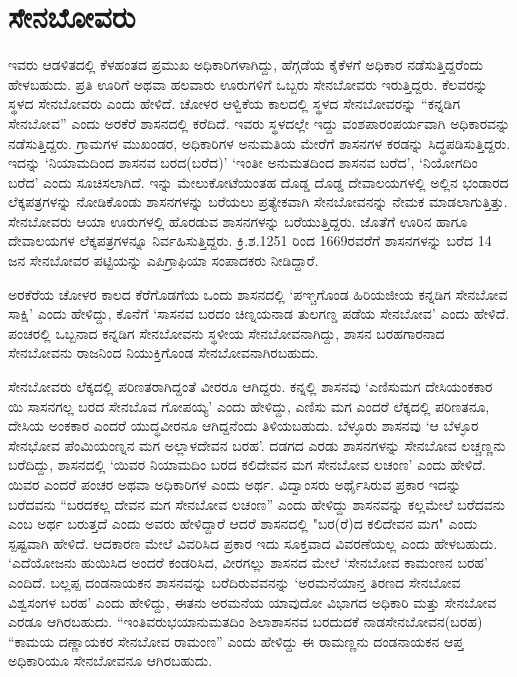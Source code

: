 \section*{ಸೇನಬೋವರು}

ಇವರು ಆಡಳಿತದಲ್ಲಿ ಕೆಳಹಂತದ ಪ್ರಮುಖ ಅಧಿಕಾರಿಗಳಾಗಿದ್ದು, ಹೆಗ್ಗಡೆಯ ಕೈಕೆಳಗೆ ಅಧಿಕಾರ ನಡೆಸುತ್ತಿದ್ದರೆಂದು ಹೇಳಬಹುದು. ಪ್ರತಿ ಊರಿಗೆ ಅಥವಾ ಹಲವಾರು ಊರುಗಳಿಗೆ ಒಬ್ಬರು ಸೇನಬೋವರು ಇರುತ್ತಿದ್ದರು. ಕೆಲವರನ್ನು ಸ್ಥಳದ ಸೇನಬೋವರು ಎಂದು ಹೇಳಿದೆ. ಚೋಳರ ಆಳ್ವಿಕೆಯ ಕಾಲದಲ್ಲಿ ಸ್ಥಳದ ಸೇನಬೋವರನ್ನು “ಕನ್ನಡಿಗ ಸೇನಬೋವ” ಎಂದು ಅರಕೆರೆ ಶಾಸನದಲ್ಲಿ ಕರೆದಿದೆ. ಇವರು ಸ್ಥಳದಲ್ಲೇ ಇದ್ದು ವಂಶಪಾರಂಪರ್ಯವಾಗಿ ಅಧಿಕಾರವನ್ನು ನಡೆಸುತ್ತಿದ್ದರು. ಗ್ರಾಮಗಳ ಮುಖಂಡರ, ಅಧಿಕಾರಿಗಳ ಅನುಮತಿಯ ಮೇರೆಗೆ ಶಾಸನಗಳ ಕರಡನ್ನು ಸಿದ್ಧಪಡಿಸುತ್ತಿದ್ದರು. ಇದನ್ನು ‘ನಿಯಾಮದಿಂದ ಶಾಸನವ ಬರದ(ಬರೆದ)’ ‘ಇಂತೀ ಅನುಮತದಿಂದ ಶಾಸನವ ಬರೆದ’, ‘ನಿಯೋಗದಿಂ ಬರೆದ’ ಎಂದು ಸೂಚಿಸಲಾಗಿದೆ. ಇನ್ನು ಮೇಲುಕೋಟೆಯಂತಹ ದೊಡ್ಡ ದೊಡ್ಡ ದೇವಾಲಯಗಳಲ್ಲಿ ಅಲ್ಲಿನ ಭಂಡಾರದ ಲೆಕ್ಕಪತ್ರಗಳನ್ನು ನೋಡಿಕೊಂಡು ಶಾಸನಗಳನ್ನು ಬರೆಯಲು ಪ್ರತ್ಯೇಕವಾಗಿ ಸೇನಬೋವನನ್ನು ನೇಮಕ ಮಾಡಲಾಗುತ್ತಿತ್ತು. ಸೇನಬೋವರು ಆಯಾ ಊರುಗಳಲ್ಲಿ ಹೊರಡುವ ಶಾಸನಗಳನ್ನು ಬರೆಯು\-ತ್ತಿದ್ದರು. ಜೊತೆಗೆ ಊರಿನ ಹಾಗೂ ದೇವಾಲಯಗಳ ಲೆಕ್ಕಪತ್ರಗಳನ್ನೂ ನಿರ್ವಹಿಸುತ್ತಿದ್ದರು. ಕ್ರಿ.ಶ.1251 ರಿಂದ 1669ರವರೆಗೆ ಶಾಸನಗಳನ್ನು ಬರೆದ 14 ಜನ ಸೇನಬೋವರ ಪಟ್ಟಿಯನ್ನು ಎಪಿಗ್ರಾಫಿಯಾ ಸಂಪಾದಕರು ನೀಡಿದ್ದಾರೆ.

ಅರಕೆರೆಯ ಚೋಳರ ಕಾಲದ ಕೆರೆಗೊಡಗೆಯ ಒಂದು ಶಾಸನದಲ್ಲಿ ‘ಪಞ್ಚಗೊಂಡ ಹಿರಿಯಜೀಯ ಕನ್ನಡಿಗ ಸೇನಬೋವ ಸಾಕ್ಷಿ’ ಎಂದು ಹೇಳಿದ್ದು, ಕೊನೆಗೆ ‘ಸಾಸನವ ಬರದಂ ಚಿಣ್ನಯನಾಡ ತುಲಗಣ್ಡ ಪಡೆಯ ಸೇನಬೋವ’ ಎಂದು ಹೇಳಿದೆ. ಪಂಚರಲ್ಲಿ ಒಬ್ಬನಾದ ಕನ್ನಡಿಗ ಸೇನಬೋವನು ಸ್ಥಳೀಯ ಸೇನಬೋವನಾಗಿದ್ದು, ಶಾಸನ ಬರಹಗಾರನಾದ ಸೇನಬೋವನು ರಾಜನಿಂದ ನಿಯುಕ್ತಿಗೊಂಡ ಸೇನಬೋವನಾಗಿರಬಹುದು.

\newpage

ಸೇನಬೋವರು ಲೆಕ್ಕದಲ್ಲಿ ಪರಿಣತರಾಗಿದ್ದಂತೆ ವೀರರೂ ಆಗಿದ್ದರು. ಕನ್ನಲ್ಲಿ ಶಾಸನವು ‘ಎಣಿಸುಮಗ ದೇಸಿಯಂಕಕಾರ ಯಿ ಸಾಸನಗಲ್ಲ ಬರದ ಸೇನಬೊವ ಗೋಪಯ್ಯ’ ಎಂದು ಹೇಳಿದ್ದು, ಎಣಿಸು ಮಗ ಎಂದರೆ ಲೆಕ್ಕದಲ್ಲಿ ಪರಿಣತನೂ, ದೇಸಿಯ ಅಂಕಕಾರ ಎಂದರೆ ಯುದ್ಧವೀರನೂ ಆಗಿದ್ದನೆಂದು ತಿಳಿಯಬಹುದು. ಬೆಳ್ಳೂರು ಶಾಸನವು ‘ಆ ಬೆಳ್ಳೂರ ಸೇನಭೋವ ಪೆಂಮಿಯಂಣ್ನನ ಮಗ ಅಲ್ಲಾಳದೇವನ ಬರಹ’. ದಡಗದ ಎರಡು ಶಾಸನಗಳನ್ನು ಸೇನಬೋವ ಲಚ್ಚಣ್ಣನು ಬರೆದಿದ್ದು, ಶಾಸನದಲ್ಲಿ ‘ಯಿವರ ನಿಯಾಮದಿಂ ಬರದ ಕಲಿದೇವನ ಮಗ ಸೇನಬೋವ ಲಚಂಣ’ ಎಂದು ಹೇಳಿದೆ. ಯಿವರ ಎಂದರೆ ಪಂಚರ ಅಥವಾ ಅಧಿಕಾರಿಗಳ ಎಂದು ಅರ್ಥ. ವಿದ್ವಾಂಸರು ಅರ್ಥೈಸಿರುವ ಪ್ರಕಾರ ಇದನ್ನು ಬರೆದವನು “ಬರದಕಲ್ಲ ದೇವನ ಮಗ ಸೇನಬೋವ ಲಚಂಣ” ಎಂದು ಹೇಳಿದ್ದು ಶಾಸನವನ್ನು ಕಲ್ಲಮೇಲೆ ಬರೆದವನು ಎಂಬ ಅರ್ಥ ಬರುತ್ತದೆ ಎಂದು ಅವರು ಹೇಳಿದ್ದಾರೆ ಆದರೆ ಶಾಸನದಲ್ಲಿ "ಬರ(ರೆ)ದ ಕಲಿದೇವನ ಮಗ" ಎಂದು ಸ್ಪಷ್ಟವಾಗಿ ಹೇಳಿದೆ. ಆದಕಾರಣ ಮೇಲೆ ವಿವರಿಸಿದ ಪ್ರಕಾರ ಇದು ಸೂಕ್ತವಾದ ವಿವರಣೆಯಲ್ಲ ಎಂದು ಹೇಳಬಹುದು. ‘ಎದೆಯೋಜನು ಹುಯಿಸಿದ ಅಂದರೆ ಕಂಡರಿಸಿದ, ವೀರಗಲ್ಲು ಶಾಸನದ ಮೇಲೆ ‘ಸೇನಬೋವ ಕಾಮಂಣನ ಬರಹ’ ಎಂದಿದೆ. ಬಲ್ಲಪ್ಪ ದಂಡನಾಯಕನ ಶಾಸನವನ್ನು ಬರೆದಿರುವವನನ್ನು ‘ಅರಮನೆಯಾನ್ತ ತಿರಣದ ಸೇನಬೋವ ವಿಶ್ವಸಂಗಳ ಬರಹ’ ಎಂದು ಹೇಳಿದ್ದು, ಈತನು ಅರಮನೆಯ ಯಾವುದೋ ವಿಭಾಗದ ಅಧಿಕಾರಿ ಮತ್ತು ಸೇನಬೋವ ಎರಡೂ ಆಗಿರಬಹುದು. “ಇಂತಿವರುಭಯಾನುಮತದಿಂ ಶಿಲಾಶಾಸನವ ಬರದುದಕೆ ನಾಡಸೇನಬೋವನ(ಬರಹ) “ಕಾಮಯ ದಣ್ಣಾಯಕರ ಸೇನಬೋವ ರಾಮಂಣ” ಎಂದು ಹೇಳಿದ್ದು ಈ ರಾಮಣ್ಣನು ದಂಡನಾಯಕನ ಆಪ್ತ ಅಧಿಕಾರಿಯೂ ಸೇನಬೋವನೂ ಆಗಿರಬಹುದು.

